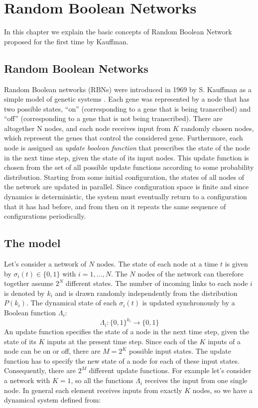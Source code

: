 \chapter{Random Boolean Networks}\label{rbn}
\lhead[\fancyplain{}{\bfseries\thepage}]{\fancyplain{}{\bfseries\rightmark}}


In this chapter we explain the basic concepts of Random Boolean Network proposed for the first time by Kauffman.

\section{Random Boolean Networks}
Random Boolean networks (RBNs) were introduced in
1969 by S. Kauffman as a simple model of genetic systems \cite{K1}.
Each gene was represented by a node
that has two possible states, “on” (corresponding to a
gene that is being transcribed) and “off” (corresponding
to a gene that is not being transcribed). There are altogether N nodes, and each node receives input from $K$
randomly chosen nodes, which represent the genes that
control the considered gene. Furthermore, each node is
assigned an \emph{update boolean function} that prescribes the state of
the node in the next time step, given the state of its input nodes. This update function is chosen from the set
of all possible update functions according to some probability distribution. Starting from some initial configuration, the states of all nodes of the network are updated
in parallel. Since configuration space is finite and since
dynamics is deterministic, the system must eventually return to a configuration that it has had before, and from
then on it repeats the same sequence of configurations
periodically.

\section{The model}
Let's consider a network of $N$ nodes. The state of each node at a time $t$ is given by $\sigma_i(t) \in \{0,1\}$ with $ i = 1,\dots,N$.
The $N$ nodes of the network can therefore together assume $2^N$ different states.
The number of incoming links to each node $i$ is denoted by $k_i$ and is drawn
randomly independently from the distribution $P(k_i)$.
The dynamical state of each $\sigma_i(t)$ is updated synchronously by a Boolean function $\Lambda_i$:
$$
\Lambda_i:\{0,1\}^{k_i} \to \{0,1\}
$$ 
An update function specifies
the state of a node in the next time step, given the state
of its $K$ inputs at the present time step. Since each of the
$K$ inputs of a node can be on or off, there are $M = 2^K$ possible input states.
The update function has to specify the new state of a node for each of these input states.
Consequently, there are $2^M$ different update functions.
For example let's consider a network with $K=1$, so all the functions $\Lambda_i$ receives the input from one single node. 
In general each element 
receives inputs from exactly $K$ nodes, so we have a dynamical system defined from:

